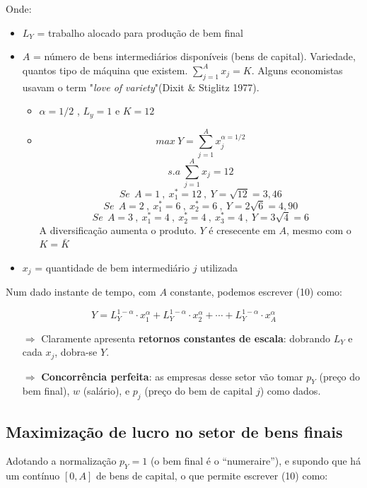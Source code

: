 \documentclass[a4paper,12pt]{article}[abntex2]
\begin{document}
Onde:
\begin{itemize}
  \item $L_Y$ = trabalho alocado para produção de bem final
  \item $A$ = número de bens intermediários disponíveis (bens de capital). Variedade, quantos tipo de máquina que existem. \(\sum_{j=1}^{A}x_j=K\). Alguns economistas usavam o term "\textit{love of variety}"(Dixit \& Stiglitz 1977).\begin{itemize}
      \item \(\alpha=1/2\) , \(L_y=1\) e \(K=12\)
      \item 
      \[
      max \ Y = \sum_{j=1}^{A} x_{j}^{\alpha=1/2}
      \]
      \[
      s.a \ \sum_{j=1}^{A} x_{j} = 12
      \]
      \[
      Se \ \ A = 1 \ , \ x_1^*=12  \ ,\ Y=\sqrt{12}=3,46
      \]
      \[
      Se \ \ A = 2 \ , \ x_1^*= 6 \ , \ x_2^*=6   \ ,\ Y=2\sqrt{6}=4,90
      \]
      \[
      Se \ \ A = 3 \ , \ x_1^*= 4 \ , \ x_2^*=4 \ , \ x_3^*= 4  \ ,\ Y=3\sqrt{4}=6
      \]
      A diversificação aumenta o produto. \(Y\) é cresecente em \(A\), mesmo com o \(K=\bar{K}\)
  \end{itemize}
  \item $x_j$ = quantidade de bem intermediário $j$ utilizada
\end{itemize}

Num dado instante de tempo, com $A$ constante, podemos escrever (10) como:

\begin{equation}
Y = L_Y^{1 - \alpha} \cdot x_1^{\alpha} + L_Y^{1 - \alpha} \cdot x_2^{\alpha} + \cdots + L_Y^{1 - \alpha} \cdot x_A^{\alpha} \tag{10'}
\end{equation}

\begin{itemize}
  \item[$\Rightarrow$] Claramente apresenta \textbf{retornos constantes de escala}: dobrando $L_Y$ e cada $x_j$, dobra-se $Y$.
  \item[$\Rightarrow$] \textbf{Concorrência perfeita}: as empresas desse setor vão tomar $p_Y$ (preço do bem final), $w$ (salário), e $p_j$ (preço do bem de capital $j$) como dados.
\end{itemize}

\subsection{\textbf{Maximização de lucro no setor de bens finais}}

Adotando a normalização $p_Y = 1$ (o bem final é o ``numeraire''), e supondo que há um contínuo $[0, A]$ de bens de capital, o que permite escrever (10) como:
\end{document}
